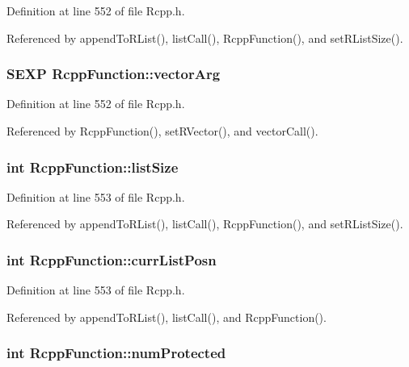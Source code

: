 Definition at line 552 of file Rcpp.h.

Referenced by appendToRList(), listCall(), RcppFunction(), and setRListSize().\hypertarget{classRcppFunction_0492c128c0f72cda44e679265b36b50e}{
\subsubsection[vectorArg]{\setlength{\rightskip}{0pt plus 5cm}SEXP {\bf RcppFunction::vectorArg}}}
\label{classRcppFunction_0492c128c0f72cda44e679265b36b50e}




Definition at line 552 of file Rcpp.h.

Referenced by RcppFunction(), setRVector(), and vectorCall().\hypertarget{classRcppFunction_c3a42478ffd123f430ba3e09099db6f8}{
\subsubsection[listSize]{\setlength{\rightskip}{0pt plus 5cm}int {\bf RcppFunction::listSize}}}
\label{classRcppFunction_c3a42478ffd123f430ba3e09099db6f8}




Definition at line 553 of file Rcpp.h.

Referenced by appendToRList(), listCall(), RcppFunction(), and setRListSize().\hypertarget{classRcppFunction_ce513a92e96b36883b709b5352ea5663}{
\subsubsection[currListPosn]{\setlength{\rightskip}{0pt plus 5cm}int {\bf RcppFunction::currListPosn}}}
\label{classRcppFunction_ce513a92e96b36883b709b5352ea5663}




Definition at line 553 of file Rcpp.h.

Referenced by appendToRList(), listCall(), and RcppFunction().\hypertarget{classRcppFunction_dc777e7d1628ccc4f531a8375f30f385}{
\subsubsection[numProtected]{\setlength{\rightskip}{0pt plus 5cm}int {\bf RcppFunction::numProtected}}}
\label{classRcppFunction_dc777e7d1628ccc4f531a8375f30f385}




